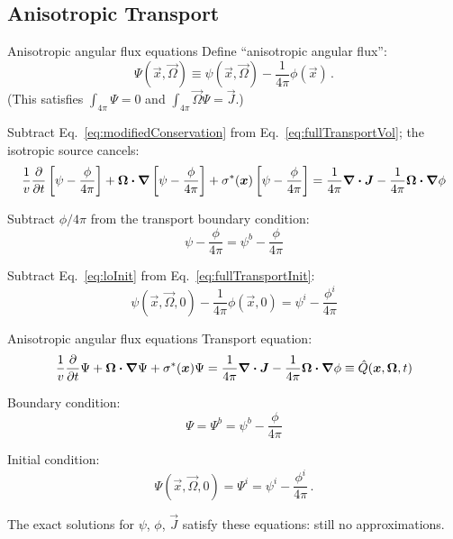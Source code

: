 \documentclass{beamer}
\begin{document}
\subsection{Anisotropic Transport}
\begin{frame}{Anisotropic angular flux equations}
  Define ``anisotropic angular flux'':
  \begin{equation} \label{eq:capPsi}
    \Psi(\vec{x}, \vec{\Omega}) \equiv \psi(\vec{x}, \vec{\Omega})
    - \frac{1}{4\pi} \phi(\vec{x})\,.
  \end{equation}
  (This satisfies $\int_{4\pi} \Psi=0$ and $\int_{4\pi} \vec{\Omega} \Psi =
  \vec{J}$.)

  Subtract Eq.~\eqref{eq:modifiedConservation} from
  Eq.~\eqref{eq:fullTransportVol}; the isotropic source cancels:
\begin{multline*}
  \frac{1}{v} \frac{\partial }{\partial t} \left[ \psi - \frac{\phi}{4\pi} \right]
    + \bm{\Omega}\bm{\cdot} \bm{\nabla} \left[ \psi - \frac{\phi}{4\pi} \right]
    + \sigma^\ast(\bm{x})\left[ \psi - \frac{\phi}{4\pi} \right]
  = \frac{1}{4\pi} \bm{\nabla} \bm{\cdot}\bm{J} -
  \frac{1}{4\pi} \bm{\Omega}\bm{\cdot} \bm{\nabla} \phi
\end{multline*}

  Subtract $\phi/4\pi$ from the transport boundary condition:
  \begin{equation*}
    \psi - \frac{\phi}{4\pi} = \psi^b - \frac{\phi}{4\pi}
  \end{equation*}

  Subtract Eq.~\eqref{eq:loInit} from Eq.~\eqref{eq:fullTransportInit}:
  \begin{equation*}
    \psi(\vec{x}, \vec{\Omega}, 0) - \frac{1}{4\pi}\phi(\vec{x}, 0)
    = \psi^i - \frac{\phi^i}{4\pi}
  \end{equation*}
\end{frame}

\begin{frame}{Anisotropic angular flux equations}
  Transport equation:
\begin{equation*}
  \frac{1}{v} \frac{\partial }{\partial t} \Psi
   + \bm{\Omega}\bm{\cdot} \bm{\nabla} \Psi
   + \sigma^\ast(\bm{x}) \Psi
  = \frac{1}{4\pi} \bm{\nabla} \bm{\cdot}\bm{J} -
  \frac{1}{4\pi} \bm{\Omega}\bm{\cdot} \bm{\nabla} \phi
  \equiv \hat Q(\bm{x}, \bm{\Omega}, t)
\end{equation*}

  Boundary condition:
  \begin{equation*}
    \Psi = \Psi^b = \psi^b - \frac{\phi}{4\pi}
  \end{equation*}

  Initial condition:
  \begin{equation*}
    \Psi(\vec{x}, \vec{\Omega}, 0) = \Psi^i = \psi^i - \frac{\phi^i}{4\pi} \,.
  \end{equation*}

  The exact solutions for $\psi$, $\phi$, $\vec{J}$ satisfy these equations: still
  no approximations.
\end{frame}
\end{document}
